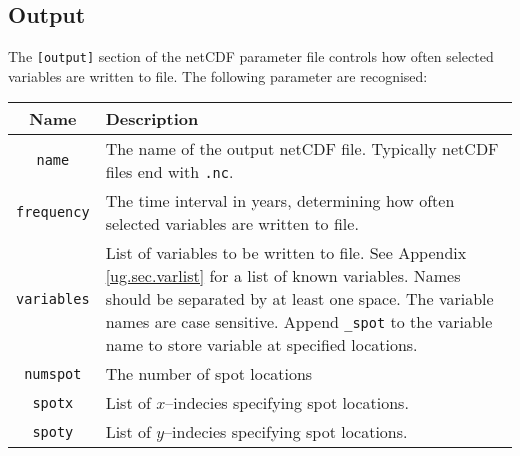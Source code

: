 \subsection{Output}\label{ug.sec.nc_out}
The \texttt{[output]} section of the netCDF parameter file controls how often selected  variables are written to file. The following parameter are recognised:
\begin{center}
\begin{tabular}{|c|p{10cm}|}
\hline
Name & Description \\
\hline
\hline
\texttt{name} & The name of the output netCDF file. Typically netCDF files end with \texttt{.nc}.\\
\hline
\texttt{frequency} & The time interval in years, determining how often selected variables are written to file.\\
\hline
\texttt{variables} & List of variables to be written to file. See Appendix \ref{ug.sec.varlist} for a list of known variables. Names should be separated by at least one space. The variable names are case sensitive. Append \texttt{\_spot} to the variable name to store variable at specified locations.\\
\hline
\texttt{numspot} & The number of spot locations\\
\hline
\texttt{spotx} & List of $x$--indecies specifying spot locations.\\
\hline
\texttt{spoty} & List of $y$--indecies specifying spot locations.\\
\hline
\end{tabular}
\end{center}
